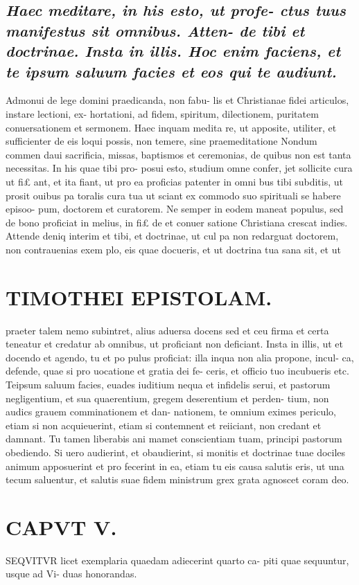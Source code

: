 \documentclass{article}
\begin{document}
\begin{pages}
\subsection*{\textit{Haec meditare, in his esto, ut profe- ctus tuus manifestus sit omnibus. Atten- de tibi et doctrinae. Insta in illis. Hoc enim faciens, et te ipsum saluum facies et eos qui te audiunt. }}\pstart Admonui de lege domini praedicanda, non fabu- lis et Christianae fidei articulos, instare lectioni, ex- hortationi, ad fidem, spiritum, dilectionem, puritatem conuersationem et sermonem. Haec inquam medita re, ut apposite, utiliter, et sufficienter de eis loqui possis, non temere, sine praemeditatione Nondum commen daui sacrificia, missas, baptismos et ceremonias, de quibus non est tanta necessitas. In his quae tibi pro- posui esto, studium omne confer, jet sollicite cura ut fi£ ant, et ita fiant, ut pro ea proficias patenter in omni bus tibi subditis, ut prosit ouibus pa toralis cura tua ut sciant ex commodo suo spirituali se habere episoo- pum, doctorem et curatorem. Ne semper in eodem maneat populus, sed de bono proficiat in melius, in fi£ de et conuer satione Christiana crescat indies.  \pend\pstart Attende deniq interim et tibi, et doctrinae, ut cul pa non redarguat doctorem, non contrauenias exem plo, eis quae docueris, et ut doctrina tua sana sit, et ut  \pend
\section*{TIMOTHEI EPISTOLAM. }
\marginpar{[ p.113 ]}\pstart praeter talem nemo subintret, alius aduersa docens sed et ceu firma et certa teneatur et credatur ab omnibus, ut proficiant non deficiant.  \pend\pstart Insta in illis, ut et docendo et agendo, tu et po pulus proficiat: illa inqua non alia propone, incul- ca, defende, quae si pro uocatione et gratia dei fe- ceris, et officio tuo incubueris etc.  \pend\pstart Teipsum saluum facies, euades iuditium nequa et infidelis serui, et pastorum negligentium, et sua quaerentium, gregem deserentium et perden- tium, non audics grauem comminationem et dan- nationem, te omnium eximes periculo, etiam si non acquieuerint, etiam si contemnent et reiiciant, non credant et damnant. Tu tamen liberabis ani mamet conscientiam tuam, principi pastorum obediendo.  \pend\pstart Si uero audierint, et obaudierint, si monitis et doctrinae tuae dociles animum apposuerint et pro fecerint in ea, etiam tu eis causa salutis eris, ut una tecum saluentur, et salutis suae fidem ministrum grex grata agnoscet coram deo.  \pend
\endnumbering\beginnumbering\section{CAPVT V.}\pstart SEQVITVR licet exemplaria quaedam adiecerint quarto ca- piti quae sequuntur, usque ad Vi- duas honorandas.  \pend

\end{pages}
\end{document}
